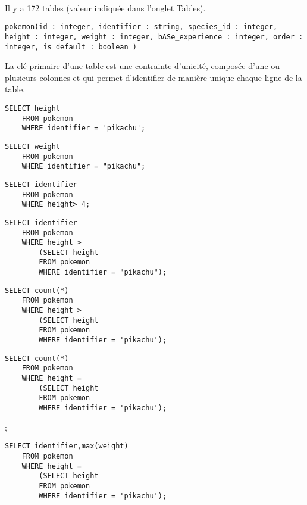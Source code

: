 \setcounter{numques}{0}~\\


\question{}
Il y a 172 tables (valeur indiquée dans l'onglet Tables).

\question{}
\texttt{pokemon(id : integer, identifier : string, species\_id : integer, height : integer, weight : integer, bASe\_experience : integer, order : integer, is\_default : boolean )} 

\question{}
La clé primaire d'une table est une contrainte d'unicité, composée d'une ou plusieurs colonnes et qui permet d'identifier de manière unique chaque ligne de la table.

%

\question{}
\begin{lstlisting}
SELECT height 
	FROM pokemon 
	WHERE identifier = 'pikachu';
\end{lstlisting}


\question{}
\begin{lstlisting}
SELECT weight 
	FROM pokemon 
	WHERE identifier = "pikachu";
\end{lstlisting}

\question{}
\begin{lstlisting}
SELECT identifier 
	FROM pokemon
	WHERE height> 4;
\end{lstlisting}

\question{}
\begin{lstlisting}
SELECT identifier 
	FROM pokemon 
	WHERE height > 
		(SELECT height 
		FROM pokemon 
		WHERE identifier = "pikachu");
\end{lstlisting}

\question{}
\begin{lstlisting}
SELECT count(*) 
	FROM pokemon 
	WHERE height > 
		(SELECT height 
		FROM pokemon 
		WHERE identifier = 'pikachu');
\end{lstlisting}

\question{}
\begin{lstlisting}
SELECT count(*) 
	FROM pokemon 
	WHERE height = 
		(SELECT height 
		FROM pokemon 
		WHERE identifier = 'pikachu');
\end{lstlisting}
  ;


\question{}
\begin{lstlisting}
SELECT identifier,max(weight) 
	FROM pokemon 
	WHERE height = 
		(SELECT height 
		FROM pokemon 
		WHERE identifier = 'pikachu'); 
\end{lstlisting}




